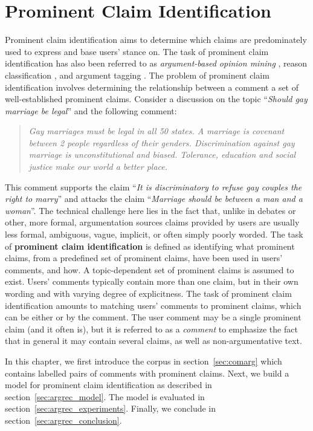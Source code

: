 \chapter{Prominent Claim Identification}
\label{chap:argrec}

Prominent claim identification aims to determine which claims are predominately
used to express and base users' stance on. The task of prominent claim
identification has also been referred to as \textit{argument-based opinion mining}
\citep{boltuzic2014back}, reason classification \citep{hasan2014you}, and
argument tagging \citep{sobhani2015argumentation}. 
The problem of prominent claim identification involves determining
the relationship between a comment a set of well-established prominent claims. 
Consider a discussion on the topic ``\emph{Should gay marriage be legal}''
and the following comment: 
\begin{quote}
\emph{
Gay marriages must be legal in all 50 states. A marriage is covenant
between 2 people regardless of their genders. Discrimination against
gay marriage is unconstitutional and biased. Tolerance, education and
social justice make our world a better place.
}
\end{quote}
This comment supports the claim ``\emph{It is discriminatory to refuse
gay couples the right to marry}'' and attacks the claim
``\emph{Marriage should be between a man and a woman}''. 
The technical challenge here lies in the fact that, unlike
in debates or other, more formal, argumentation sources
claims provided by users are usually less formal, ambiguous, vague, 
implicit, or often simply poorly worded. 
The task of \textbf{prominent claim identification} is defined 
as identifying what prominent claims, from a predefined set of prominent claims, 
have been used in users' comments, and how. 
A topic-dependent set of prominent claims is assumed to exist. 
Users' comments typically contain more than one claim, but in their 
own wording and with varying degree of explicitness. 
The task of prominent claim identification amounts to matching
users' comments to prominent claims, which can be either  or 
 by the comment. 
The user comment may be a single prominent claim (and it often is), but it 
is referred to as a \textit{comment} to emphasize the fact that in general 
it may contain several claims, as well as non-argumentative text. 

In this chapter, we first introduce the \ComArg corpus in section~\ref{sec:comarg}
which contains labelled pairs of comments with prominent claims. Next, 
we build a model for prominent claim identification as described in 
section~\ref{sec:argrec_model}. The model is evaluated in 
section~\ref{sec:argrec_experiments}. Finally, we conclude in 
section~\ref{sec:argrec_conclusion}.

